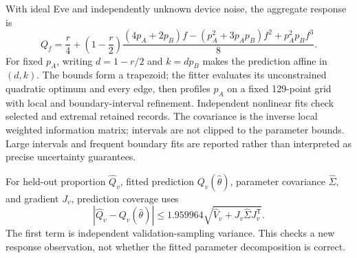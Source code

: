 With ideal Eve and independently unknown device noise, the aggregate response is
\begin{equation}
 Q_f=\frac r4+\left(1-\frac r2\right)
 \frac{(4p_A+2p_B)f-(p_A^2+3p_Ap_B)f^2+p_A^2p_Bf^3}{8}.
 \label{eq:unequalresponse}
\end{equation}
For fixed $p_A$, writing $d=1-r/2$ and $k=dp_B$ makes the prediction affine
in $(d,k)$. The bounds form a trapezoid; the fitter evaluates its unconstrained
quadratic optimum and every edge, then profiles $p_A$ on a fixed 129-point grid
with local and boundary-interval refinement. Independent nonlinear fits check
selected and extremal retained records. The covariance is the inverse local
weighted information matrix; intervals are not clipped to the parameter bounds.
Large intervals and frequent boundary fits are reported rather than interpreted
as precise uncertainty guarantees.

For held-out proportion $\widehat Q_v$, fitted prediction $Q_v(\widehat\theta)$,
parameter covariance $\widehat\Sigma$, and gradient $J_v$, prediction coverage uses
\begin{equation}
 \left|\widehat Q_v-Q_v(\widehat\theta)\right|
 \leq1.959964\sqrt{\widehat V_v+J_v\widehat\Sigma J_v^{\mathsf T}}.
\end{equation}
The first term is independent validation-sampling variance. This checks a new
response observation, not whether the fitted parameter decomposition is correct.

